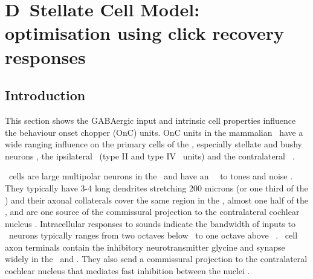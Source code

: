 

\section[DS Cell Model]{D~Stellate Cell Model: optimisation using click recovery responses    \label{sec:d-stellate-cell-model}}

\subsection{Introduction    \label{sec:DS:introduction}}

This section shows the GABAergic input and intrinsic cell properties
influence the behaviour onset chopper (OnC) units.  OnC units in
the mammalian \VCN~have a wide ranging influence on the primary cells
of the \VCN, especially stellate and bushy neurons
\citep{RhodeSmithEtAl:1983}, the ipsilateral \DCN~(type II and type IV
\EIRA~units) and the contralateral \CN~\citep{NeedhamPaolini:2007}.


  
\DS~cells are large multipolar neurons in the \VCN~and have an \OnC~\PSTH~to
tones and noise \citep{SmithRhode:1989, NeedhamPaolini:2006}.  They typically
have 3-4 long dendrites stretching 200 microns (or one third of the \VCN) and
their axonal collaterals cover the same region in the \VCN, almost one half of
the \DCN, and are one source of the commissural projection to the contralateral
cochlear nucleus \citep{Cant:1992,Cant:1981,SchofieldCant:1996,CantBenson:2003,
  NeedhamPaolini:2007, PaoliniClark:1999}. Intracellular responses to sounds
indicate the bandwidth of inputs to \DS~neurons typically ranges from two
octaves below \CF~to one octave above \CF~\citep{PalmerJiangEtAl:1996,
  JiangPalmerEtAl:1996, PaoliniClark:1999}. \DS~cell axon terminals contain the
inhibitory neurotransmitter glycine and synapse widely in the \VCN~and \DCN\@.
They also send a commissural projection to the contralateral cochlear nucleus
that mediates fast inhibition between the nuclei \citep{NeedhamPaolini:2003,
  NeedhamPaolini:2006, Oertel:1997}.

